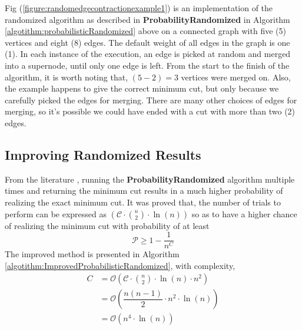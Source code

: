 \documentclass[longpaper, english, final, times]{revdetua}
\begin{document}
			
			Fig (\ref{figure:randomedgecontractionexample1}) is an implementation of the randomized algorithm as described in \textbf{ProbabilityRandomized} in Algorithm \ref{algotithm:probabilisticRandomized} above on a connected graph with five (5) vertices and eight (8) edges. The default weight of all edges in the graph is one (1). In each instance of the execution, an edge is picked at random and merged into a supernode, until only one edge is left. From the start to the finish of the algorithm, it is worth noting that, $(5-2)=3$ vertices were merged on. Also, the example happens to give the correct minimum cut, but only because we carefully picked the edges for merging. There are many other choices of edges for merging, so it's possible we could have ended with a cut with more than two (2) edges.\\
		
		\subsection{Improving Randomized Results}
			From the literature \cite{mincutandkargersalgorithm}, running the \textbf{ProbabilityRandomized} algorithm multiple times and returning the minimum cut results in a much higher probability of realizing the exact minimum cut. It was proved that, the number of trials to perform can be expressed as $\left(\mathcal{C}\cdot {n\choose 2}\cdot \ln (n)\right)$ so as to have a higher chance of realizing the minimum cut with probability of at least $$\mathcal{P}\ge 1-\dfrac{1}{n^C}$$
			The improved method is presented in Algorithm \ref{algotithm:ImprovedProbabilisticRandomized}, with complexity, 
			\begin{align*}
				C &=\mathcal{O}\left(\mathcal{C}\cdot {n\choose 2}\cdot \ln (n) \cdot n^2 \right)\\
				&= \mathcal{O}\left(\dfrac{n(n-1)}{2}\cdot n^2\cdot \ln(n)\right)\\
				&=\mathcal{O}\left(n^4\cdot \ln(n)\right)
			\end{align*}
			
\end{document}
